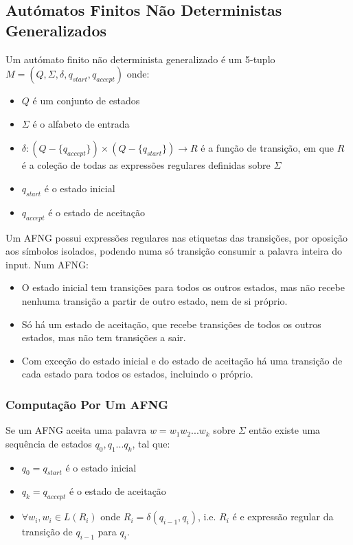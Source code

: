 \documentclass[10pt,a4paper]{report}
\begin{document}
\subsection{Autómatos Finitos Não Deterministas Generalizados}
Um autómato finito não determinista generalizado é um 5-tuplo $M =(Q,\Sigma,\delta,q_{start},q_{accept})$ onde:
\begin{itemize}
\item $Q$ é um conjunto de estados
\item $\Sigma$ é o alfabeto de entrada
\item $\delta:(Q-\{q_{accept}\}) \times (Q-\{q_{start}\}) \rightarrow R$ é a função de transição, em que $R$ é a coleção de todas as expressões regulares definidas sobre $\Sigma$
\item $q_{start}$ é o estado inicial
\item $q_{accept}$ é o estado de aceitação
\end{itemize}
Um AFNG possui expressões regulares nas etiquetas das transições, por oposição aos símbolos isolados, podendo numa só transição consumir a palavra inteira do input. Num AFNG:
\begin{itemize}
\item O estado inicial tem transições para todos os outros estados, mas não recebe nenhuma transição a partir de outro estado, nem de si próprio.
\item Só há um estado de aceitação, que recebe transições de todos os outros estados, mas não tem transições a sair.
\item Com exceção do estado inicial e do estado de aceitação há uma transição de cada estado para todos os estados, incluindo o próprio.
\end{itemize}
\subsubsection{Computação Por Um AFNG}
Se um AFNG aceita uma palavra $w = w_1w_2...w_k$ sobre $\Sigma$ então existe uma sequência de estados $q_0,q_1...q_k$, tal que:
\begin{itemize}
\item $q_0 = q_{start}$ é o estado inicial
\item $q_k = q_{accept}$ é o estado de aceitação
\item $\forall w_i, w_i \in L(R_i)$ onde $R_i = \delta(q_{i-1},q_i)$, i.e. $R_i$ é e expressão regular da transição de $q_{i-1}$ para $q_i$.
\end{itemize}
\end{document}
